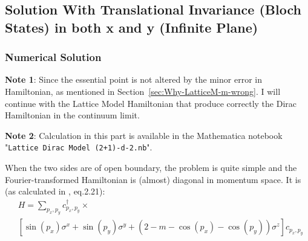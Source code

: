 \documentclass{article}
\begin{document}
\subsection{Solution With Translational Invariance (Bloch States) in
both x and y (Infinite Plane)}

    \subsubsection{Numerical Solution}
    \label{sec:Numerical Solution}


    \textbf{Note 1}: Since the essential point is not altered by the minor
    error in Hamiltonian, as mentioned in
    Section~\ref{sec:Why-LatticeM-m-wrong}. I will continue with the
    Lattice Model Hamiltonian that produce correctly the Dirac Hamiltonian
    in the continuum limit.

    \textbf{Note 2}: Calculation in this part is available in the
    Mathematica notebook "\texttt{Lattice Dirac Model (2+1)-d-2.nb}".

    When the two sides are of open boundary, the problem is quite simple
    and the Fourier-transformed Hamiltonian is (almost) diagonal in
    momentum space. It is (as calculated in \cite{Hughes2009}, eq.2.21):
    \begin{align}
        &H =\sum_{p_x,p_y} c^\dagger_{p_x,p_y}\times
        \nonumber\\
        &
        \left[
            \sin(p_x)\sigma^x + \sin(p_y)\sigma^y
            +(2-m-\cos(p_x)-\cos(p_y))\sigma^z
        \right] c_{p_x,p_y}
    \end{align}
\end{document}
